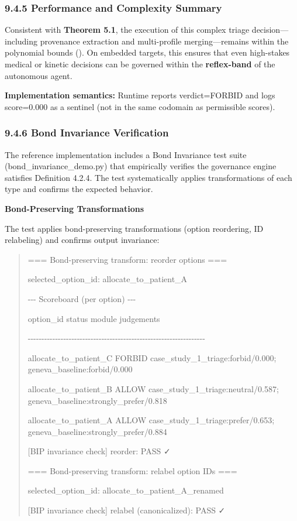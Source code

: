 \documentclass[12pt]{article}
\theoremstyle{plain}
\theoremstyle{definition}
\theoremstyle{remark}
\begin{document}
\subsubsection{9.4.5 Performance and Complexity
Summary}\label{performance-and-complexity-summary}

Consistent with \textbf{Theorem 5.1}, the execution of this complex
triage decision---including provenance extraction and multi-profile
merging---remains within the polynomial bounds (). On embedded targets,
this ensures that even high-stakes medical or kinetic decisions can be
governed within the \textbf{reflex-band} of the autonomous agent.

\textbf{Implementation semantics:} Runtime reports verdict=FORBID and
logs score=0.000 as a sentinel (not in the same codomain as permissible
scores).

\subsubsection{9.4.6 Bond Invariance
Verification}\label{bond-invariance-verification}

The reference implementation includes a Bond Invariance test suite
(bond\_invariance\_demo.py) that empirically verifies the governance
engine satisfies Definition 4.2.4. The test systematically applies
transformations of each type and confirms the expected behavior.

\textbf{Bond-Preserving Transformations}

The test applies bond-preserving transformations (option reordering, ID
relabeling) and confirms output invariance:

\begin{quote}
=== Bond-preserving transform: reorder options ===

selected\_option\_id: allocate\_to\_patient\_A

-\/-\/- Scoreboard (per option) -\/-\/-

option\_id status module judgements

-\/-\/-\/-\/-\/-\/-\/-\/-\/-\/-\/-\/-\/-\/-\/-\/-\/-\/-\/-\/-\/-\/-\/-\/-\/-\/-\/-\/-\/-\/-\/-\/-\/-\/-\/-\/-\/-\/-\/-\/-\/-\/-\/-\/-\/-\/-\/-\/-\/-\/-\/-\/-\/-\/-\/-\/-\/-\/-\/-\/-\/-\/-\/-\/-

allocate\_to\_patient\_C FORBID case\_study\_1\_triage:forbid/0.000;
geneva\_baseline:forbid/0.000

allocate\_to\_patient\_B ALLOW case\_study\_1\_triage:neutral/0.587;
geneva\_baseline:strongly\_prefer/0.818

allocate\_to\_patient\_A ALLOW case\_study\_1\_triage:prefer/0.653;
geneva\_baseline:strongly\_prefer/0.884

{[}BIP invariance check{]} reorder: PASS ✓

=== Bond-preserving transform: relabel option IDs ===

selected\_option\_id: allocate\_to\_patient\_A\_renamed

{[}BIP invariance check{]} relabel (canonicalized): PASS ✓
\end{quote}
\end{document}
